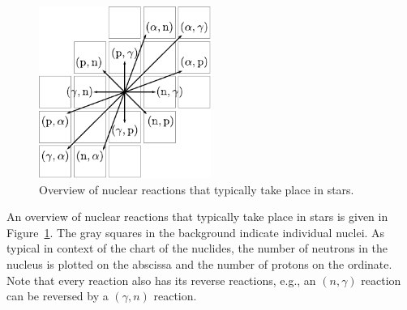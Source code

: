 \begin{figure}[tb]
    \centering
    \includegraphics[width=0.5\textwidth]{graphics/p-nuclei/reaction_schematic}
    \caption{Overview of nuclear reactions that typically take place in stars.}
    \label{fig:p-nuclei:reaction_schematic_overview}
\end{figure}
An overview of nuclear reactions that typically take place in stars is given in Figure~\ref{fig:p-nuclei:reaction_schematic_overview}. The gray squares in the background indicate individual nuclei. As typical in context of the chart of the nuclides, the number of neutrons in the nucleus is plotted on the abscissa and the number of protons on the ordinate. Note that every reaction also has its reverse reactions, e.g., an $(n,\gamma)$ reaction can be reversed by a $(\gamma, n)$ reaction.


